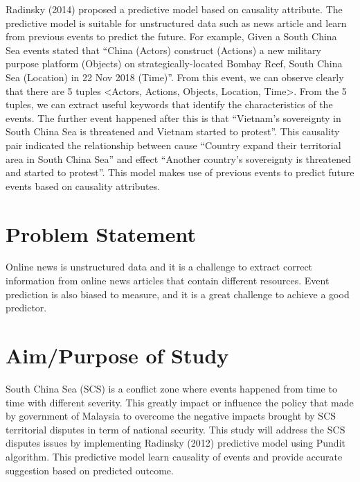 \documentclass[twosides]{utmthesis}
\begin{document}
Radinsky (2014) proposed a predictive model based on causality attribute. The predictive model is suitable for unstructured data such as news article and learn from previous events to predict the future. For example, Given a South China Sea events stated that “China (Actors) construct (Actions) a new military purpose platform (Objects) on strategically-located Bombay Reef, South China Sea (Location) in 22 Nov 2018 (Time)”. From this event, we can observe clearly that there are 5 tuples <Actors, Actions, Objects, Location, Time>. From the 5 tuples, we can extract useful keywords that identify the characteristics of the events. The further event happened after this is that “Vietnam’s sovereignty in South China Sea is threatened and Vietnam started to protest”. This causality pair indicated the relationship between cause “Country expand their territorial area in South China Sea” and effect “Another country’s sovereignty is threatened and started to protest”. This model makes use of previous events to predict future events based on causality attributes. 


\section{Problem Statement}
Online news is unstructured data and it is a challenge to extract correct information from online news articles that contain different resources. Event prediction is also biased to measure, and it is a great challenge to achieve a good predictor. 

\section{Aim/Purpose of Study}
South China Sea (SCS) is a conflict zone where events happened from time to time with different severity. This greatly impact or influence the policy that made by government of Malaysia to overcome the negative impacts brought by SCS territorial disputes in term of national security. This study will address the SCS disputes issues by implementing Radinsky (2012) predictive model using Pundit algorithm. This predictive model learn causality of events and provide accurate suggestion based on predicted outcome.  
\end{document}
